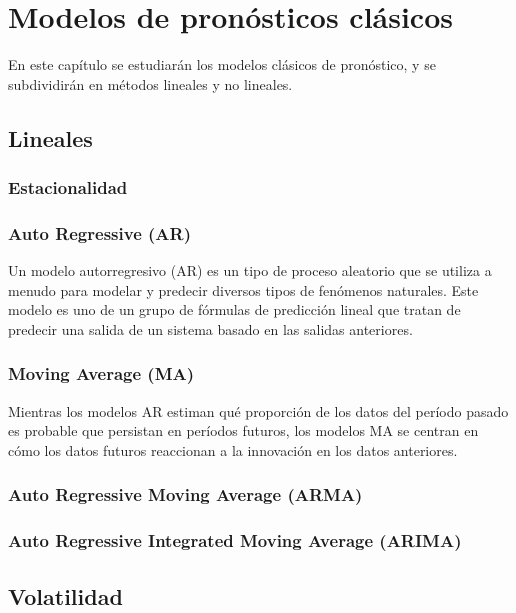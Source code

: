 \section{Modelos de pronósticos clásicos}

En este capítulo se estudiarán los modelos clásicos de pronóstico, y se subdividirán en métodos lineales y no lineales.

\subsection{Lineales}

\subsubsection{Estacionalidad}

\subsubsection{Auto Regressive (AR)}

Un modelo autorregresivo (AR) es un tipo de proceso aleatorio que se utiliza a menudo para modelar y predecir diversos tipos de fenómenos naturales. 
Este modelo es uno de un grupo de fórmulas de predicción lineal que tratan de predecir una salida de un sistema basado en las salidas anteriores.

\subsubsection{Moving Average (MA)}

Mientras los modelos AR estiman qué proporción de los datos del período pasado es probable que persistan en períodos futuros, los modelos MA se centran
en cómo los datos futuros reaccionan a la innovación en los datos anteriores.

\subsubsection{Auto Regressive Moving Average (ARMA)}
\subsubsection{Auto Regressive Integrated Moving Average (ARIMA)}

\subsection{Volatilidad}
